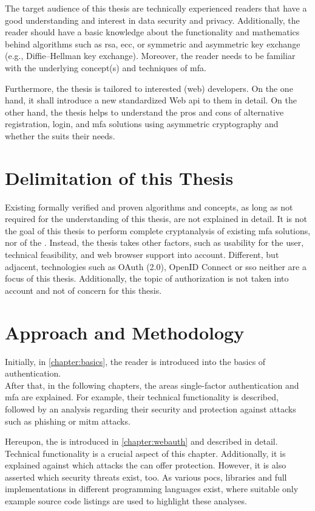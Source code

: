 The target audience of this thesis are technically experienced readers that have a good understanding and interest in data security and privacy. Additionally, the reader should have a basic knowledge about the functionality and mathematics behind algorithms such as \gls{rsa}, \gls{ecc}, or symmetric and asymmetric key exchange (e.g., Diffie–Hellman key exchange). Moreover, the reader needs to be familiar with the underlying concept(s) and techniques of \gls{mfa}.

Furthermore, the thesis is tailored to interested (web) developers. On the one hand, it shall introduce a new standardized Web \gls{api} to them in detail. On the other hand, the thesis helps to understand the pros and cons of alternative registration, login, and \gls{mfa} solutions using asymmetric cryptography and whether the \wa{} suits their needs.

\section{Delimitation of this Thesis}

Existing formally verified and proven algorithms and concepts, as long as not required for the understanding of this thesis, are not explained in detail. It is not the goal of this thesis to perform complete cryptanalysis of existing \gls{mfa} solutions, nor of the \wa. Instead, the thesis takes other factors, such as usability for the user, technical feasibility, and web browser support into account. Different, but adjacent, technologies such as OAuth (2.0), OpenID Connect or \gls{sso} neither are a focus of this thesis. Additionally, the topic of authorization is not taken into account and not of concern for this thesis. 

\section{Approach and Methodology}

Initially, in \autoref{chapter:basics}, the reader is introduced into the basics of authentication.\\
After that, in the following chapters, the areas single-factor authentication and \gls{mfa} are explained. For example, their technical functionality is described, followed by an analysis regarding their security and protection against attacks such as phishing or \gls{mitm} attacks.

Hereupon, the \wa{} is introduced in \autoref{chapter:webauth} and described in detail. Technical functionality is a crucial aspect of this chapter. Additionally, it is explained against which attacks the \wa{} can offer protection. However, it is also asserted which security threats exist, too. As various \glspl{poc}, libraries and full implementations in different programming languages exist, where suitable only example source code listings are used to highlight these analyses.

